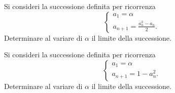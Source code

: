\documentclass[italian,a4paper]{scrartcl}
\begin{document}
\begin{exercise}
  Si consideri la successione definita per ricorrenza
  \[
  \begin{cases}
    a_1 = \alpha\\
    a_{n+1} = \frac{a_n^2-a_n}{2}.
  \end{cases}
  \]
  Determinare al variare di $\alpha$ il limite della successione.
\end{exercise}

\begin{exercise}
  Si consideri la successione definita per ricorrenza
  \[
  \begin{cases}
    a_1 = \alpha \\
    a_{n+1} = 1 - a_n^2.
  \end{cases}
  \]
  Determinare al variare di $\alpha$ il limite della successione.
\end{exercise}
\end{document}
